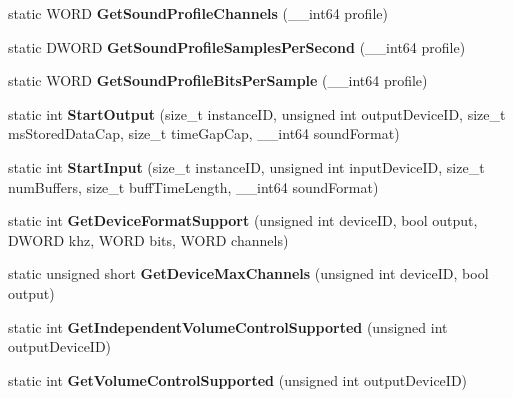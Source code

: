 \begin{DoxyCompactItemize}
\item 
\hypertarget{structmn_c_l_r_ae3373ccd64172f55319d26a1e3e6aba3}{
static WORD {\bfseries GetSoundProfileChannels} (\_\-\_\-int64 profile)}
\label{structmn_c_l_r_ae3373ccd64172f55319d26a1e3e6aba3}

\item 
\hypertarget{structmn_c_l_r_a332ffadc4afcfc5a8f2388180551eca1}{
static DWORD {\bfseries GetSoundProfileSamplesPerSecond} (\_\-\_\-int64 profile)}
\label{structmn_c_l_r_a332ffadc4afcfc5a8f2388180551eca1}

\item 
\hypertarget{structmn_c_l_r_aca8af5f9bbb4e9ecba019b6f7e8a9cd7}{
static WORD {\bfseries GetSoundProfileBitsPerSample} (\_\-\_\-int64 profile)}
\label{structmn_c_l_r_aca8af5f9bbb4e9ecba019b6f7e8a9cd7}

\item 
\hypertarget{structmn_c_l_r_a0df4ee3c0c713883eeff50d63e383b7f}{
static int {\bfseries StartOutput} (size\_\-t instanceID, unsigned int outputDeviceID, size\_\-t msStoredDataCap, size\_\-t timeGapCap, \_\-\_\-int64 soundFormat)}
\label{structmn_c_l_r_a0df4ee3c0c713883eeff50d63e383b7f}

\item 
\hypertarget{structmn_c_l_r_aeef957f50a2d2fc376cda70657c5991c}{
static int {\bfseries StartInput} (size\_\-t instanceID, unsigned int inputDeviceID, size\_\-t numBuffers, size\_\-t buffTimeLength, \_\-\_\-int64 soundFormat)}
\label{structmn_c_l_r_aeef957f50a2d2fc376cda70657c5991c}

\item 
\hypertarget{structmn_c_l_r_a481efb7e5a5ece729ed02bf5583907be}{
static int {\bfseries GetDeviceFormatSupport} (unsigned int deviceID, bool output, DWORD khz, WORD bits, WORD channels)}
\label{structmn_c_l_r_a481efb7e5a5ece729ed02bf5583907be}

\item 
\hypertarget{structmn_c_l_r_ab19f158b80bc9561b7dc84a26e823c28}{
static unsigned short {\bfseries GetDeviceMaxChannels} (unsigned int deviceID, bool output)}
\label{structmn_c_l_r_ab19f158b80bc9561b7dc84a26e823c28}

\item 
\hypertarget{structmn_c_l_r_a37ed672f55f20f4aa0feb0579955934c}{
static int {\bfseries GetIndependentVolumeControlSupported} (unsigned int outputDeviceID)}
\label{structmn_c_l_r_a37ed672f55f20f4aa0feb0579955934c}

\item 
\hypertarget{structmn_c_l_r_a4339b2c53cad8fb6b27fd645298a7c3a}{
static int {\bfseries GetVolumeControlSupported} (unsigned int outputDeviceID)}
\label{structmn_c_l_r_a4339b2c53cad8fb6b27fd645298a7c3a}


\end{DoxyCompactItemize}
